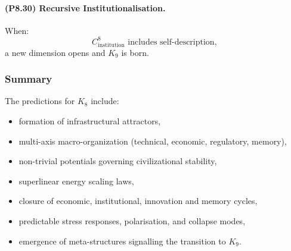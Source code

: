 \paragraph{(P8.30) Recursive Institutionalisation.}
When:
\[
C_{\mathrm{institution}}^8
\text{ includes self-description},
\]
a new dimension opens and $K_9$ is born.

\subsubsection{Summary}

The predictions for $K_8$ include:
\begin{itemize}
    \item formation of infrastructural attractors,
    \item multi-axis macro-organization (technical, economic, regulatory, memory),
    \item non-trivial potentials governing civilizational stability,
    \item superlinear energy scaling laws,
    \item closure of economic, institutional, innovation and memory cycles,
    \item predictable stress responses, polarisation, and collapse modes,
    \item emergence of meta-structures signalling the transition to $K_9$.
\end{itemize}
